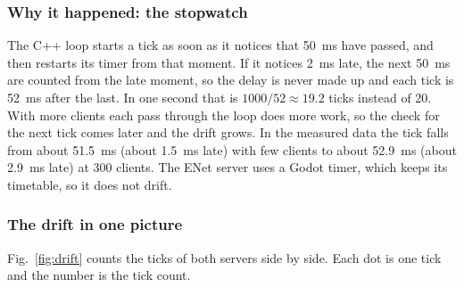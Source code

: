 \IfFileExists{IEEEtran.cls}{\ieeetrue\documentclass[conference]{IEEEtran}}{\ieeefalse\documentclass[twocolumn,10pt]{article}}
\begin{document}
\subsubsection{Why it happened: the stopwatch}
The C++ loop starts a tick as soon as it notices that 50~ms have passed, and then restarts its timer from that moment. If it notices 2~ms late, the next 50~ms are counted from the late moment, so the delay is never made up and each tick is 52~ms after the last. In one second that is $1000/52 \approx 19.2$ ticks instead of 20. With more clients each pass through the loop does more work, so the check for the next tick comes later and the drift grows. In the measured data the tick falls from about 51.5~ms (about 1.5~ms late) with few clients to about 52.9~ms (about 2.9~ms late) at 300 clients. The ENet server uses a Godot timer, which keeps its timetable, so it does not drift.

\subsubsection{The drift in one picture}
Fig.~\ref{fig:drift} counts the ticks of both servers side by side. Each dot is one tick and the number is the tick count.
\end{document}
